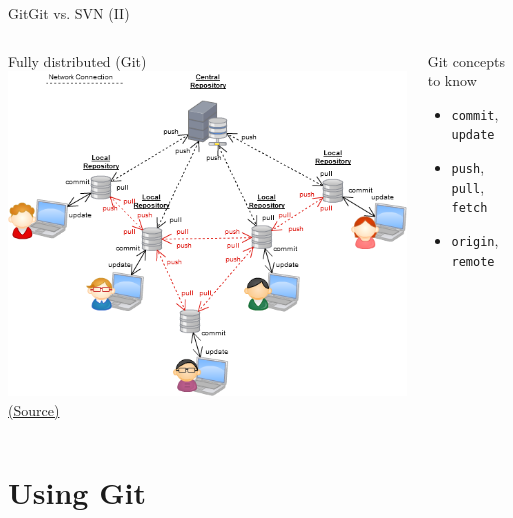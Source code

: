 \documentclass[10pt,compress]{beamer} %
\begin{document}
\begin{frame}{Git}{Git vs. SVN (II)}
\begin{center}
\begin{columns}
	\centering Fully distributed (Git)\\\smallskip
	\includegraphics[width=\linewidth]{figs/fulldistributed.png}
	\tiny \href{http://softwareengineering.stackexchange.com/questions/35074/im-a-subversion-geek-why-should-i-consider-or-not-consider-mercurial-or-git-or}{(Source)}

	\begin{block}{Git concepts to know}
	\begin{itemize}
	\item \texttt{commit}, \texttt{update}
	\item \texttt{push}, \texttt{pull}, \texttt{fetch}
	\item \texttt{origin}, \texttt{remote}
	\end{itemize}
	\end{block}
\end{columns}

\end{center}

\end{frame}


\section{Using Git}
\end{document}
